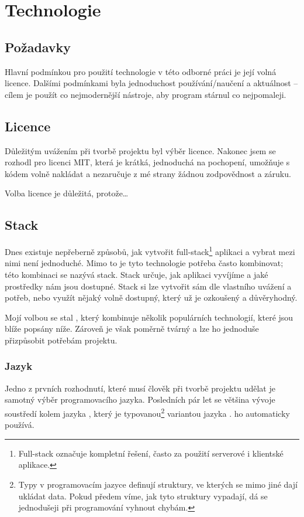 \hypertarget{Technologie}{\chapter{Technologie}}

\section{Požadavky}

Hlavní podmínkou pro použití technologie v této odborné práci je její volná licence. Dalšími podmínkami byla jednoduchost používání/naučení a aktuálnost -- cílem je použít co nejmodernější nástroje, aby program stárnul co nejpomaleji.

\section{Licence}

Důležitým uvážením při tvorbě projektu byl výběr licence. Nakonec jsem se rozhodl pro licenci MIT, která je krátká, jednoduchá na pochopení, umožňuje s kódem volně nakládat a nezaručuje z mé strany žádnou zodpovědnost a záruku.\cite{choosealicense}

Volba licence je důležitá, protože\dots

\section{Stack}

Dnes existuje nepřeberně způsobů, jak vytvořit full-stack\footnote{Full-stack označuje kompletní řešení, často za použití serverové i klientské aplikace.} aplikaci a vybrat mezi nimi není jednoduché. Mimo to je tyto technologie potřeba často kombinovat; této kombinaci se nazývá stack. Stack určuje, jak aplikaci vyvíjíme a jaké prostředky nám jsou dostupné. Stack si lze vytvořit sám dle vlastního uvážení a potřeb, nebo využít nějaký volně dostupný, který už je ozkoušený a důvěryhodný.

Mojí volbou se stal , který kombinuje několik populárních technologií, které jsou blíže popsány níže. Zároveň je však poměrně tvárný a lze ho jednoduše přizpůsobit potřebám projektu.\cite{t3stack}

\subsection{Jazyk}

Jedno z prvních rozhodnutí, které musí člověk při tvorbě projektu udělat je samotný výběr programovacího jazyka. Posledních pár let se většina vývoje soustředí kolem jazyka , který je typovanou\footnote{Typy v programovacím jazyce definují struktury, ve kterých se mimo jiné dají ukládat data. Pokud předem víme, jak tyto struktury vypadají, dá se jednodušeji při programování vyhnout chybám.} variantou jazyka .  ho automaticky používá. 

